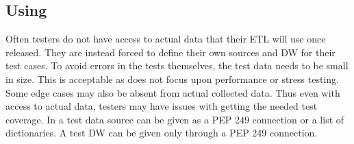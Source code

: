 \subsection{Using \FW{}}
Often testers do not have access to actual data that their ETL will use once released. They are instead forced to define their own sources and DW  for their test cases. To avoid errors in the tests themselves, the test data needs to be small in size. This is acceptable as \FW{} does not focus upon  performance or stress testing. Some edge cases may also be absent from actual collected data. Thus even with access to actual data, testers may have issues with getting the needed test coverage. In \FW{} a test data source can be given as a  PEP 249 connection or a list of dictionaries. A test DW can be given only through a PEP 249 connection. 












